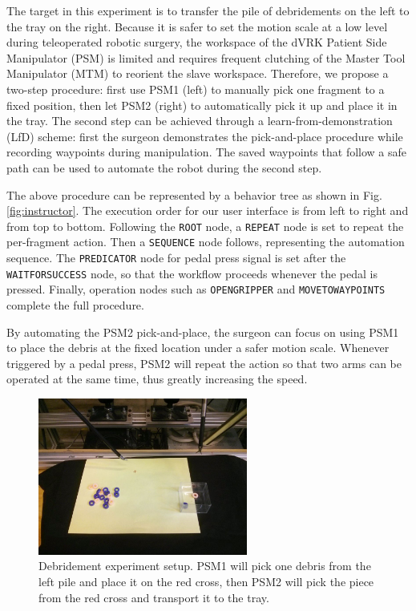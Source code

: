 \documentclass[letterpaper, 10 pt, conference]{ieeeconf}
\begin{document}
The target in this experiment is to transfer the pile of debridements  on the left to the tray on the right. Because it is safer to set the motion scale at a low level during teleoperated robotic surgery, the workspace of the dVRK Patient Side Manipulator (PSM) is limited and requires frequent clutching of the Master Tool Manipulator (MTM) to reorient the slave workspace. Therefore, we propose a two-step procedure: first use PSM1 (left) to manually pick one fragment to a fixed position, then let PSM2 (right) to automatically pick it up and place it in the tray. The second step can be achieved through a learn-from-demonstration (LfD) scheme: first the surgeon demonstrates the pick-and-place procedure while recording waypoints during manipulation. The saved waypoints that follow a safe path can be used to automate the robot during the second step. 

The above procedure can be represented by a behavior tree as shown in Fig. \ref{fig:instructor}. The execution order for our user interface is from left to right and from top to bottom. Following the \texttt{ROOT} node, a \texttt{REPEAT} node is set to repeat the per-fragment action. Then a \texttt{SEQUENCE} node follows, representing the automation sequence. The \texttt{PREDICATOR} node for pedal press signal is set after the \texttt{WAITFORSUCCESS} node, so that the workflow proceeds whenever the pedal is pressed. Finally, operation nodes such as \texttt{OPENGRIPPER} and \texttt{MOVETOWAYPOINTS} complete the full procedure. 

By automating the PSM2 pick-and-place, the surgeon can focus on using PSM1 to place the debris at the fixed location under a safer motion scale. Whenever triggered by a pedal press, PSM2 will repeat the action so that two arms can be operated at the same time, thus greatly increasing the speed.  


\begin{figure}[bt]
\centering
\includegraphics[width=195pt]{debridement.jpg}
\caption{Debridement experiment setup. PSM1 will pick one debris from the left pile and place it on the red cross, then PSM2 will pick the piece from the red cross and transport it to the tray.}
\label{fig:debridement}
\end{figure}
\end{document}
